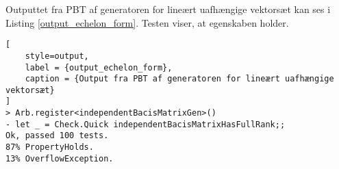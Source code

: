 Outputtet fra PBT af generatoren for lineært uafhængige vektorsæt kan ses i Listing \ref{output_echelon_form}. Testen viser, at egenskaben holder.

\begin{lstlisting}[
    style=output,
    label = {output_echelon_form},
    caption = {Output fra PBT af generatoren for lineært uafhængige vektorsæt}
]
> Arb.register<independentBacisMatrixGen>()
- let _ = Check.Quick independentBacisMatrixHasFullRank;;
Ok, passed 100 tests.
87% PropertyHolds.
13% OverflowException.
\end{lstlisting}
